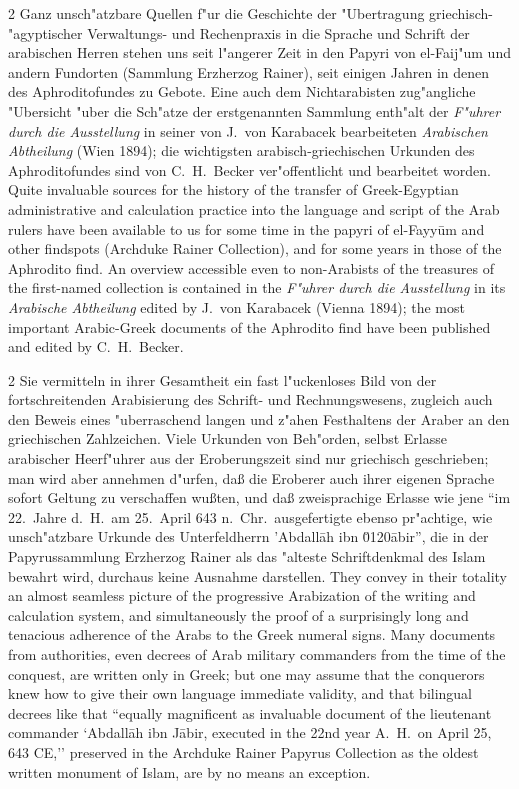 \documentclass[10pt,a4paper]{article}
\renewcommand{\switchcolumn}{\syncronize\nointerlineskip\columnbreak}
\newcommand{\enquote}[1]{``#1''}
\begin{document}
\begin{paracol}{2}
Ganz unsch"atzbare Quellen f"ur die Geschichte der "Ubertragung griechisch-"agyptischer Verwaltungs- und Rechenpraxis in die Sprache und Schrift der arabischen Herren stehen uns seit l"angerer Zeit in den Papyri von el-Faij"um und andern Fundorten (Sammlung Erzherzog Rainer), seit einigen Jahren in denen des Aphroditofundes zu Gebote. Eine auch dem Nichtarabisten zug"angliche "Ubersicht "uber die Sch"atze der erstgenannten Sammlung enth"alt der \textit{F"uhrer durch die Ausstellung} in seiner von J.\ von Karabacek bearbeiteten \textit{Arabischen Abtheilung} (Wien 1894); die wichtigsten arabisch-griechischen Urkunden des Aphroditofundes sind von C.\ H.\ Becker ver"offentlicht und bearbeitet worden.
\switchcolumn
Quite invaluable sources for the history of the transfer of Greek-Egyptian administrative and calculation practice into the language and script of the Arab rulers have been available to us for some time in the papyri of el-Fayy\=um and other findspots (Archduke Rainer Collection), and for some years in those of the Aphrodito find. An overview accessible even to non-Arabists of the treasures of the first-named collection is contained in the \textit{F"uhrer durch die Ausstellung} in its \textit{Arabische Abtheilung} edited by J.\ von Karabacek (Vienna 1894); the most important Arabic-Greek documents of the Aphrodito find have been published and edited by C.\ H.\ Becker.
\end{paracol}

\begin{paracol}{2}
Sie vermitteln in ihrer Gesamtheit ein fast l"uckenloses Bild von der fortschreitenden Arabisierung des Schrift- und Rechnungswesens, zugleich auch den Beweis eines "uberraschend langen und z"ahen Festhaltens der Araber an den griechischen Zahlzeichen. Viele Urkunden von Beh"orden, selbst Erlasse arabischer Heerf"uhrer aus der Eroberungszeit sind nur griechisch geschrieben; man wird aber annehmen d"urfen, da\ss{} die Eroberer auch ihrer eigenen Sprache sofort Geltung zu verschaffen wu\ss{}ten, und da\ss{} zweisprachige Erlasse wie jene \enquote{im 22.\ Jahre d.\ H.\ am 25.\ April 643 n.\ Chr.\ ausgefertigte ebenso pr"achtige, wie unsch"atzbare Urkunde des Unterfeldherrn 'Abdall\=ah ibn \u0120\=abir}, die in der Papyrussammlung Erzherzog Rainer als das "alteste Schriftdenkmal des Islam bewahrt wird, durchaus keine Ausnahme darstellen.
\switchcolumn
They convey in their totality an almost seamless picture of the progressive Arabization of the writing and calculation system, and simultaneously the proof of a surprisingly long and tenacious adherence of the Arabs to the Greek numeral signs. Many documents from authorities, even decrees of Arab military commanders from the time of the conquest, are written only in Greek; but one may assume that the conquerors knew how to give their own language immediate validity, and that bilingual decrees like that ``equally magnificent as invaluable document of the lieutenant commander `Abdall\=ah ibn J\=abir, executed in the 22nd year A.\ H.\ on April 25, 643 CE,'' preserved in the Archduke Rainer Papyrus Collection as the oldest written monument of Islam, are by no means an exception.
\end{paracol}
\end{document}
